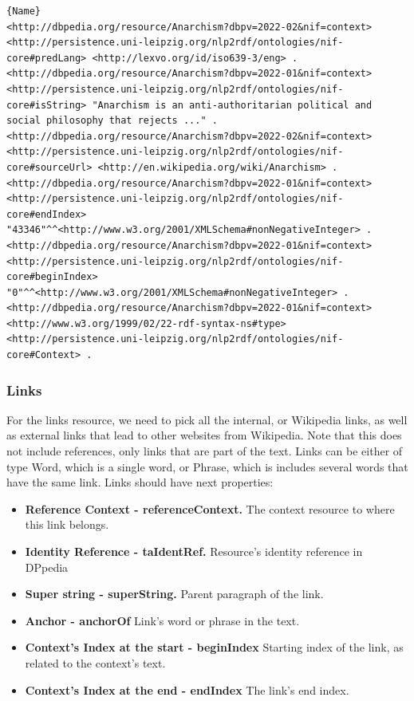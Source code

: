 \documentclass[thesis=M,english,hidelinks]{FITthesis}[2019/12/23]
\begin{document}
\begin{lstlisting}[caption=Example of an output for context in NIF format,frame=tlrb,  label = {lst:nif-context}]{Name}
<http://dbpedia.org/resource/Anarchism?dbpv=2022-02&nif=context> <http://persistence.uni-leipzig.org/nlp2rdf/ontologies/nif-core#predLang> <http://lexvo.org/id/iso639-3/eng> .
<http://dbpedia.org/resource/Anarchism?dbpv=2022-01&nif=context> <http://persistence.uni-leipzig.org/nlp2rdf/ontologies/nif-core#isString> "Anarchism is an anti-authoritarian political and social philosophy that rejects ..." .
<http://dbpedia.org/resource/Anarchism?dbpv=2022-02&nif=context> <http://persistence.uni-leipzig.org/nlp2rdf/ontologies/nif-core#sourceUrl> <http://en.wikipedia.org/wiki/Anarchism> .
<http://dbpedia.org/resource/Anarchism?dbpv=2022-01&nif=context> <http://persistence.uni-leipzig.org/nlp2rdf/ontologies/nif-core#endIndex> "43346"^^<http://www.w3.org/2001/XMLSchema#nonNegativeInteger> .
<http://dbpedia.org/resource/Anarchism?dbpv=2022-01&nif=context> <http://persistence.uni-leipzig.org/nlp2rdf/ontologies/nif-core#beginIndex> "0"^^<http://www.w3.org/2001/XMLSchema#nonNegativeInteger> .
<http://dbpedia.org/resource/Anarchism?dbpv=2022-01&nif=context> <http://www.w3.org/1999/02/22-rdf-syntax-ns#type> <http://persistence.uni-leipzig.org/nlp2rdf/ontologies/nif-core#Context> .
\end{lstlisting}

\subsubsection{Links}

For the links resource, we need to pick all the internal, or Wikipedia links, as well as external links that lead to other websites from Wikipedia. Note that this does not include references, only links that are part of the text. Links can be either of type Word, which is a single word, or Phrase, which is includes several words that have the same link. Links should have next properties:

\begin{itemize}
	\item \textbf{Reference Context - referenceContext.} The context resource to where this link belongs.
	\item \textbf{Identity Reference - taIdentRef.} Resource's identity reference in DPpedia
	\item \textbf{Super string - superString.} Parent paragraph of the link.
	\item \textbf{Anchor - anchorOf} Link's word or phrase in the text.
	\item \textbf{Context's Index at the start - beginIndex} Starting index of the link, as related to the context's text.
	\item \textbf{Context's Index at the end - endIndex} The link's end index.
\end{itemize}
\end{document}
